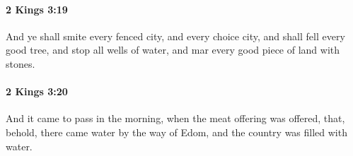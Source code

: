 		\paragraph{2 Kings 3:19} %
			\label{2KINGS-3-19}

			And ye shall smite every fenced city, and every choice city, and shall fell every good tree, and stop all wells of water, and mar every good piece of land with stones.


		\paragraph{2 Kings 3:20} %
			\label{2KINGS-3-20}

			And it came to pass in the morning, when the meat offering was offered, that, behold, there came water by the way of Edom, and the country was filled with water.


